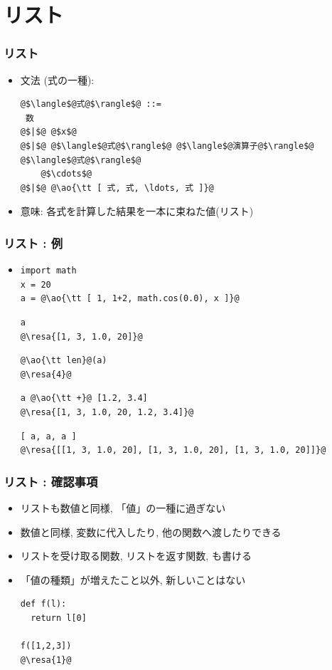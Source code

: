 \documentclass[10pt,dvipdfmx]{beamer}
\newcommand{\ore}[1]{{\color{orange}#1}}
\newcommand{\ao}[1]{{\color{blue}#1}}
\newcommand{\resa}[1]{\ore{\textsl{$\rightarrow$ #1}}}
\begin{document}
\section{リスト}

\begin{frame}[fragile]
\frametitle{リスト}
\begin{itemize}
\item 文法 (式の一種):
\begin{lstlisting}
@$\langle$@式@$\rangle$@ ::=
 数
@$|$@ @$x$@
@$|$@ @$\langle$@式@$\rangle$@ @$\langle$@演算子@$\rangle$@ @$\langle$@式@$\rangle$@
    @$\cdots$@
@$|$@ @\ao{\tt [ 式, 式, \ldots, 式 ]}@
\end{lstlisting}

\item 意味: 各式を計算した結果を一本に束ねた値(リスト)
\end{itemize}
\end{frame}

\begin{frame}[fragile]
\frametitle{リスト : 例}
\begin{itemize}
\item []
\begin{lstlisting}
import math
x = 20
a = @\ao{\tt [ 1, 1+2, math.cos(0.0), x ]}@
\end{lstlisting}
\begin{lstlisting}
a
@\resa{[1, 3, 1.0, 20]}@
\end{lstlisting}
\begin{lstlisting}
@\ao{\tt len}@(a)
@\resa{4}@
\end{lstlisting}
\begin{lstlisting}
a @\ao{\tt +}@ [1.2, 3.4]
@\resa{[1, 3, 1.0, 20, 1.2, 3.4]}@
\end{lstlisting}
\begin{lstlisting}
[ a, a, a ]
@\resa{[[1, 3, 1.0, 20], [1, 3, 1.0, 20], [1, 3, 1.0, 20]]}@
\end{lstlisting}
\end{itemize}
\end{frame}

\begin{frame}[fragile]
\frametitle{リスト : 確認事項}
\begin{itemize}
\item リストも数値と同様, 「値」の一種に過ぎない
\item 数値と同様, 変数に代入したり, 他の関数へ渡したりできる
\item リストを受け取る関数, リストを返す関数, も書ける
\item \ao{「値の種類」が増えたこと以外, 新しいことはない}
\begin{lstlisting}
def f(l):
  return l[0]

f([1,2,3]) 
@\resa{1}@
\end{lstlisting}
\end{itemize}
\end{frame}
\end{document}
